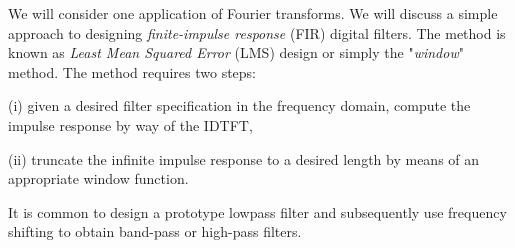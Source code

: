\documentclass{article}
\begin{document}
\begin{CellGroup}


We will consider one application of Fourier transforms. We will discuss a simple approach to designing {\itshape finite-impulse response} (FIR) digital
filters. The method is known as {\itshape Least Mean Squared Error} (LMS) design or simply the "{\itshape window}" method. The method requires two
steps:

(i) given a desired filter specification in the frequency domain, compute the impulse response by way of the IDTFT,

(ii) truncate the infinite impulse response to a desired length by means of an appropriate window function.

 It is common to design a prototype lowpass filter and subsequently use frequency shifting to obtain band-pass or high-pass filters.




\end{CellGroup}
\end{document}
